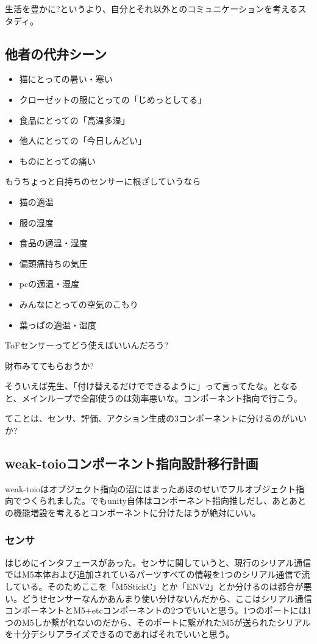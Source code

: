 \documentclass[fleqn,twocolumn]{mynote}
\begin{document}
生活を豊かに?というより、自分とそれ以外とのコミュニケーションを考えるスタディ。

\subsection*{他者の代弁シーン}
\begin{itemize}
  \item 猫にとっての暑い・寒い
  \item クローゼットの服にとっての「じめっとしてる」
  \item 食品にとっての「高温多湿」
  \item 他人にとっての「今日しんどい」
  \item ものにとっての痛い
\end{itemize}

もうちょっと自持ちのセンサーに根ざしていうなら
\begin{itemize}
  \item 猫の適温
  \item 服の湿度
  \item 食品の適温・湿度
  \item 偏頭痛持ちの気圧
  \item pcの適温・湿度
  \item みんなにとっての空気のこもり
  \item 葉っぱの適温・湿度
\end{itemize}

ToFセンサーってどう使えばいいんだろう?

財布みててもらおうか?

そういえば先生、「付け替えるだけでできるように」って言ってたな。となると、メインループで全部使うのは効率悪いな。コンポーネント指向で行こう。

てことは、センサ、評価、アクション生成の3コンポーネントに分けるのがいいか?

\subsection*{weak-toioコンポーネント指向設計移行計画}
weak-toioはオブジェクト指向の沼にはまったあほのせいでフルオブジェクト指向でつくられました。でもunity自体はコンポーネント指向推しだし、あとあとの機能増設を考えるとコンポーネントに分けたほうが絶対にいい。

\subsubsection*{センサ}
はじめにインタフェースがあった。センサに関していうと、現行のシリアル通信ではM5本体および追加されているパーツすべての情報を1つのシリアル通信で流している。そのためここを「M5StickC」とか「ENV2」とか分けるのは都合が悪い。どうせセンサーなんかあんまり使い分けないんだから、ここはシリアル通信コンポーネントとM5+etcコンポーネントの2つでいいと思う。1つのポートには1つのM5しか繋がれないのだから、そのポートに繋がれたM5が送られたシリアルを十分デシリアライズできるのであればそれでいいと思う。
\end{document}
